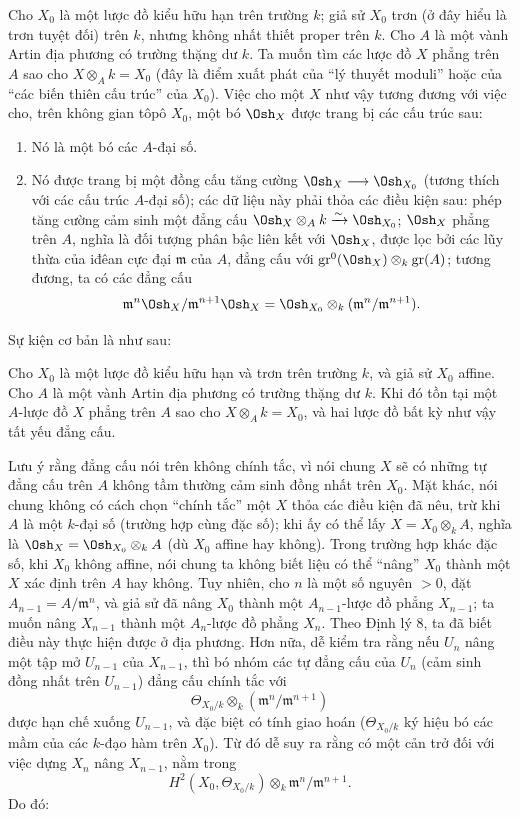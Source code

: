 Cho $X_0$ là một lược đồ kiểu hữu hạn trên trường $k$; giả sử $X_0$ trơn (ở
đây hiểu là trơn tuyệt đối) trên $k$, nhưng không nhất thiết proper trên $k$.
Cho $A$ là một vành Artin địa phương có trường thặng dư $k$. Ta muốn tìm các
lược đồ $X$ phẳng trên $A$ sao cho $X\otimes_A k=X_0$ (đây là điểm xuất phát
của “lý thuyết moduli” hoặc của “các biến thiên cấu trúc” của $X_0$). Việc cho
một $X$ như vậy tương đương với việc cho, trên không gian tôpô $X_0$, một bó
$\Osh_X$ được trang bị các cấu trúc sau:
\begin{enumerate}
  \item[\textit{i.}] Nó là một bó các $A$-đại số.
  \item[\textit{ii.}] Nó được trang bị một đồng cấu tăng cường
    $\Osh_X\longrightarrow\Osh_{X_0}$ (tương thích với các cấu trúc
    $A$-đại số); các dữ liệu này phải thỏa các điều kiện sau: phép tăng cường
    cảm sinh một đẳng cấu
    $\Osh_X\otimes_A k\xrightarrow{\sim}\Osh_{X_0}$; $\Osh_X$ phẳng trên
    $A$, nghĩa là đối tượng phân bậc liên kết với $\Osh_X$, được lọc bởi các
    lũy thừa của iđêan cực đại $\mathfrak m$ của $A$, đẳng cấu với
    $\operatorname{gr}^0(\Osh_X)\otimes_k\operatorname{gr}(A)$; tương đương,
    ta có các đẳng cấu
    \[
      \mathfrak m^n\Osh_X/\mathfrak m^{n+1}\Osh_X
      =\Osh_{X_0}\otimes_k(\mathfrak m^n/\mathfrak m^{n+1}).
    \]
\end{enumerate}
Sự kiện cơ bản là như sau:

 Cho $X_0$ là một lược đồ kiểu hữu hạn và trơn trên trường
$k$, và giả sử $X_0$ affine. Cho $A$ là một vành Artin địa phương có trường
thặng dư $k$. Khi đó tồn tại một $A$-lược đồ $X$ phẳng trên $A$ sao cho
$X\otimes_A k=X_0$, và hai lược đồ bất kỳ như vậy tất yếu đẳng cấu.

Lưu ý rằng đẳng cấu nói trên không chính tắc, vì nói chung $X$ sẽ có những tự
đẳng cấu trên $A$ không tầm thường cảm sinh đồng nhất trên $X_0$. Mặt khác,
nói chung không có cách chọn “chính tắc” một $X$ thỏa các điều kiện đã nêu,
trừ khi $A$ là một $k$-đại số (trường hợp cùng đặc số); khi ấy có thể lấy
$X=X_0\otimes_k A$, nghĩa là $\Osh_X=\Osh_{X_0}\otimes_k A$ (dù $X_0$ affine
hay không). Trong trường hợp khác đặc số, khi $X_0$ không affine, nói chung ta
không biết liệu có thể “nâng” $X_0$ thành một $X$ xác định trên $A$ hay không.
Tuy nhiên, cho $n$ là một số nguyên $>0$, đặt
$A_{n-1}=A/\mathfrak m^n$, và giả sử đã nâng $X_0$ thành một
$A_{n-1}$-lược đồ phẳng $X_{n-1}$; ta muốn nâng $X_{n-1}$ thành một
$A_n$-lược đồ phẳng $X_n$. Theo Định lý 8, ta đã biết điều này thực hiện được
ở địa phương. Hơn nữa, dễ kiểm tra rằng nếu $U_n$ nâng một tập mở $U_{n-1}$
của $X_{n-1}$, thì bó nhóm các tự đẳng cấu của $U_n$ (cảm sinh đồng nhất trên
$U_{n-1}$) đẳng cấu chính tắc với
\[
  \Theta_{X_0/k}\otimes_k(\mathfrak m^n/\mathfrak m^{n+1})
\]
được hạn chế xuống $U_{n-1}$, và đặc biệt có tính giao hoán
($\Theta_{X_0/k}$ ký hiệu bó các mầm của các $k$-đạo hàm trên $X_0$). Từ đó
dễ suy ra rằng có một cản trở đối với việc dựng $X_n$ nâng $X_{n-1}$, nằm
trong
\[
  H^2(X_0,\Theta_{X_0/k})\otimes_k
  \mathfrak m^n/\mathfrak m^{n+1}.
\]
Do đó:

